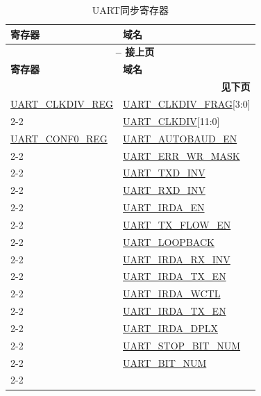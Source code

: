 \documentclass[main\_\_CN.tex]{subfiles}
\begin{document}
\begin{longtable}[c]{|p{6cm}|p{6cm}|}
\caption{UART同步寄存器}
\label{tab:uart-sync-reg} \\
    \hline
    \rowcolor{lightgray}
    \textbf{寄存器} & \textbf{域名} \\\hline
    \endfirsthead
    
    \multicolumn{2}{c}{\bfseries \tablename\ \thetable{} -- 接上页}\\\hline
    \rowcolor{lightgray}
    \textbf{寄存器} & \textbf{域名} \\\hline
    \endhead
    
    \multicolumn{2}{r}{\textbf{见下页}} \\
    \endfoot    
    \endlastfoot
    
\hyperref[regdesc:UARTCLKDIVREG]{UART\_CLKDIV\_REG} & \hyperref[fielddesc:UARTCLKDIVFRAG]{UART\_CLKDIV\_FRAG}[3:0] \\\cline{2-2}
 & \hyperref[fielddesc:UARTCLKDIV]{UART\_CLKDIV}[11:0] \\\hline
\hyperref[regdesc:UARTCONF0REG]{UART\_CONF0\_REG}  & \hyperref[fielddesc:UARTAUTOBAUDEN]{UART\_AUTOBAUD\_EN} \\\cline{2-2} 
 & \hyperref[fielddesc:UARTERRWRMASK]{UART\_ERR\_WR\_MASK} \\\cline{2-2} 
 & \hyperref[fielddesc:UARTTXDINV]{UART\_TXD\_INV} \\\cline{2-2} 
 & \hyperref[fielddesc:UARTRXDINV]{UART\_RXD\_INV} \\\cline{2-2} 
 & \hyperref[fielddesc:UARTIRDAEN]{UART\_IRDA\_EN} \\\cline{2-2} 
 & \hyperref[fielddesc:UARTTXFLOWEN]{UART\_TX\_FLOW\_EN} \\\cline{2-2} 
 & \hyperref[fielddesc:UARTLOOPBACK]{UART\_LOOPBACK} \\\cline{2-2} 
 & \hyperref[fielddesc:UARTIRDARXINV]{UART\_IRDA\_RX\_INV} \\\cline{2-2} 
 & \hyperref[fielddesc:UARTIRDATXEN]{UART\_IRDA\_TX\_EN} \\\cline{2-2} 
 & \hyperref[fielddesc:UARTIRDAWCTL]{UART\_IRDA\_WCTL} \\\cline{2-2} 
 & \hyperref[fielddesc:UARTIRDATXEN]{UART\_IRDA\_TX\_EN} \\\cline{2-2} 
 & \hyperref[fielddesc:UARTIRDADPLX]{UART\_IRDA\_DPLX} \\\cline{2-2} 
 & \hyperref[fielddesc:UARTSTOPBITNUM]{UART\_STOP\_BIT\_NUM} \\\cline{2-2} 
 & \hyperref[fielddesc:UARTBITNUM]{UART\_BIT\_NUM} \\\cline{2-2} 

\end{longtable}
\end{document}

